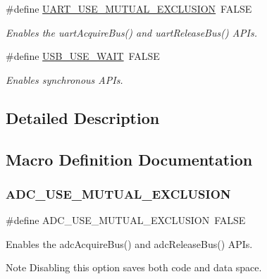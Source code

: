 \begin{DoxyCompactItemize}
\#define \hyperlink{group__HAL__CONF_gae689e57cf792af401c324de566038687}{U\+A\+R\+T\+\_\+\+U\+S\+E\+\_\+\+M\+U\+T\+U\+A\+L\+\_\+\+E\+X\+C\+L\+U\+S\+I\+ON}~F\+A\+L\+SE
\begin{DoxyCompactList}\small\item\em Enables the {\ttfamily uart\+Acquire\+Bus()} and {\ttfamily uart\+Release\+Bus()} A\+P\+Is. \end{DoxyCompactList}\item 
\#define \hyperlink{group__HAL__CONF_ga150144a73f541c7aca03c61f5ae16a6e}{U\+S\+B\+\_\+\+U\+S\+E\+\_\+\+W\+A\+IT}~F\+A\+L\+SE
\begin{DoxyCompactList}\small\item\em Enables synchronous A\+P\+Is. \end{DoxyCompactList}\end{DoxyCompactItemize}


\subsection{Detailed Description}


\subsection{Macro Definition Documentation}
\hypertarget{group__HAL__CONF_gac0893cb47e338c2dabad34b974a0a88d}{}\label{group__HAL__CONF_gac0893cb47e338c2dabad34b974a0a88d} 
\subsubsection{\texorpdfstring{A\+D\+C\+\_\+\+U\+S\+E\+\_\+\+M\+U\+T\+U\+A\+L\+\_\+\+E\+X\+C\+L\+U\+S\+I\+ON}{ADC\_USE\_MUTUAL\_EXCLUSION}}
{\footnotesize\ttfamily \#define A\+D\+C\+\_\+\+U\+S\+E\+\_\+\+M\+U\+T\+U\+A\+L\+\_\+\+E\+X\+C\+L\+U\+S\+I\+ON~F\+A\+L\+SE}



Enables the {\ttfamily adc\+Acquire\+Bus()} and {\ttfamily adc\+Release\+Bus()} A\+P\+Is. 

\begin{DoxyNote}{Note}
Disabling this option saves both code and data space. 
\end{DoxyNote}
\hypertarget{group__HAL__CONF_ga39e892a4090185fbdda9bb105bc03b4f}{}\label{group__HAL__CONF_ga39e892a4090185fbdda9bb105bc03b4f} 

